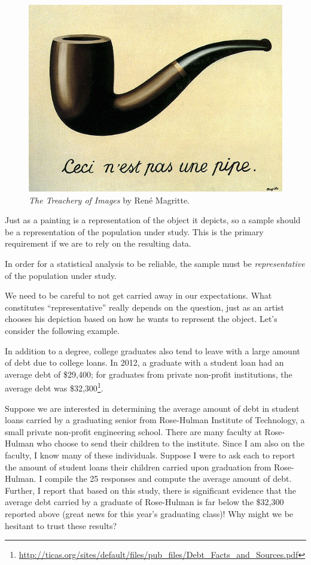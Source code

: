\documentclass[]{book}
\let\rmarkdownfootnote\footnote%
\def\footnote{\protect\rmarkdownfootnote}
\theoremstyle{plain}
\theoremstyle{mydefn}
\theoremstyle{myexmpl}
\theoremstyle{remark}
\let\BeginKnitrBlock\begin \let\EndKnitrBlock\end
\let\BeginKnitrBlock\begin \let\EndKnitrBlock\end
\begin{document}
\begin{figure}

{\centering \includegraphics[width=0.8\linewidth]{./images/Data-Pipe} 

}

\caption{\emph{The Treachery of Images} by René
Magritte.}\label{fig:data-pipe-img}
\end{figure}

Just as a painting is a representation of the object it depicts, so a
sample should be a representation of the population under study. This is
the primary requirement if we are to rely on the resulting data.

\BeginKnitrBlock{rmdkeyidea}
In order for a statistical analysis to be reliable, the sample must be
\emph{representative} of the population under study.
\EndKnitrBlock{rmdkeyidea}

We need to be careful to not get carried away in our expectations. What
constitutes ``representative'' really depends on the question, just as
an artist chooses his depiction based on how he wants to represent the
object. Let's consider the following example.

\BeginKnitrBlock{example}[School Debt]
\protect\hypertarget{exm:data-school-debt}{}{\label{exm:data-school-debt}
{} }In addition to a degree, college graduates
also tend to leave with a large amount of debt due to college loans. In
2012, a graduate with a student loan had an average debt of \$29,400;
for graduates from private non-profit institutions, the average debt was
\$32,300\footnote{\url{http://ticas.org/sites/default/files/pub_files/Debt_Facts_and_Sources.pdf}}.

Suppose we are interested in determining the average amount of debt in
student loans carried by a graduating senior from Rose-Hulman Institute
of Technology, a small private non-profit engineering school. There are
many faculty at Rose-Hulman who choose to send their children to the
institute. Since I am also on the faculty, I know many of these
individuals. Suppose I were to ask each to report the amount of student
loans their children carried upon graduation from Rose-Hulman. I compile
the 25 responses and compute the average amount of debt. Further, I
report that based on this study, there is significant evidence that the
average debt carried by a graduate of Rose-Hulman is far below the
\$32,300 reported above (great news for this year's graduating class)!
Why might we be hesitant to trust these results?
\EndKnitrBlock{example}
\end{document}
